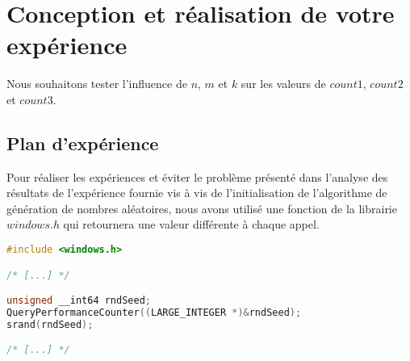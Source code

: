 
\section{Conception et réalisation de votre expérience}
Nous souhaitons tester l'influence de $n$, $m$ et $k$ sur les valeurs de $count1$, $count2$ et $count3$.

\subsection{Plan d'expérience}


Pour réaliser les expériences et éviter le problème présenté dans l'analyse des résultats de l'expérience fournie vis à vis de l'initialisation de l'algorithme de génération de nombres aléatoires, nous avons utilisé une fonction de la librairie $windows.h$ qui retournera une valeur différente à chaque appel.

\begin{lstlisting}[language=C]
#include <windows.h>

/* [...] */

unsigned __int64 rndSeed;
QueryPerformanceCounter((LARGE_INTEGER *)&rndSeed);
srand(rndSeed);

/* [...] */
\end{lstlisting}


